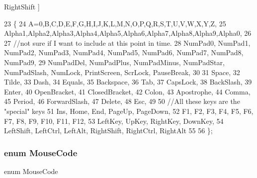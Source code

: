 \begin{Desc}
\begin{description}
{Right\+Shift\label{_input_engine_8h_a7885f47644a0388f981f416fa20389b2a313634ce234828dbab4831f3f9785c29}
}]\item[{\em 
Right\+Ctrl\label{_input_engine_8h_a7885f47644a0388f981f416fa20389b2a2547c705cfe3746586780d5b83be1b87}
}]\item[{\em 
Right\+Alt\label{_input_engine_8h_a7885f47644a0388f981f416fa20389b2a921b0aeb42b5d50d18c28d65842ca613}
}]\end{description}
\end{Desc}

\begin{DoxyCode}
23 \{
24     A=0,B,C,D,E,F,G,H,I,J,K,L,M,N,O,P,Q,R,S,T,U,V,W,X,Y,Z,
25     Alpha1,Alpha2,Alpha3,Alpha4,Alpha5,Alpha6,Alpha7,Alpha8,Alpha9,Alpha0,
26 
27     \textcolor{comment}{//not sure if I want to include at this point in time.}
28     NumPad0, NumPad1, NumPad2, NumPad3, NumPad4, NumPad5, NumPad6, NumPad7, 
      NumPad8, NumPad9,
29     NumPadDel, NumPadPlus, NumPadMinus, NumPadStar, NumPadSlash, NumLock, 
      PrintScreen, ScrLock, PauseBreak,
30 
31     Space,
32     Tilde,
33     Dash,
34     Equals,
35     Backspace,
36     Tab,
37     CapsLock,
38     BackSlash,
39     Enter,
40     OpenBracket,
41     ClosedBracket,
42     Colon,
43     Apostrophe,
44     Comma,
45     Period,
46     ForwardSlash,
47     Delete,
48     Esc,
49 
50     \textcolor{comment}{//All these keys are the "special" keys}
51     Ins, Home, End, PageUp, PageDown,
52     F1, F2, F3, F4, F5, F6, F7, F8, F9, F10, F11, F12,
53     LeftKey, UpKey, RightKey, DownKey,
54     LeftShift, LeftCtrl, LeftAlt, RightShift, RightCtrl, RightAlt
55 
56 \};
\end{DoxyCode}
\subsubsection[{Mouse\+Code}]{\setlength{\rightskip}{0pt plus 5cm}enum {\bf Mouse\+Code}}\label{_input_engine_8h_a6efe7ee2439e057808289ba4b6b1d394}


enum Mouse\+Code 

